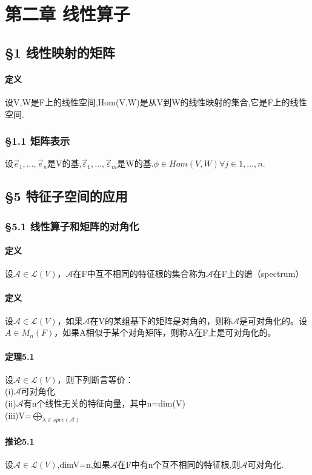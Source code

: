 \documentclass{ctexart}
\begin{document}
\section{第二章 线性算子}
\subsection{§1 线性映射的矩阵}
\paragraph{定义}
设V,W是F上的线性空间,Hom(V,W)是从V到W的线性映射的集合,它是F上的线性空间.
\subsubsection{§1.1 矩阵表示}
设$\vec{e}_{1},...,\vec{e}_{n}$是V的基,$\vec{\varepsilon}_{1},...,\vec{\varepsilon}_{m}$是W的基.$\phi  \in Hom(V,W)    \forall j \in 1,...,n$. 
\subsection{§5 特征子空间的应用}
\subsubsection{§5.1 线性算子和矩阵的对角化}
\paragraph{定义}
设$\mathcal{A}\in\mathcal{L}(V)$，$\mathcal{A}$在F中互不相同的特征根的集合称为$\mathcal{A}$在F上的谱（spectrum）
\paragraph{定义}
设$\mathcal{A}\in\mathcal{L}(V)$，如果$\mathcal{A}$在V的某组基下的矩阵是对角的，则称$\mathcal{A}$是可对角化的。设$A \in M_{n}(F)$，如果A相似于某个对角矩阵，则称A在F上是可对角化的。
\paragraph{定理5.1}
设$\mathcal{A}\in \mathcal{L}(V)$，则下列断言等价：\\
(i)$\mathcal{A}$可对角化\\
(ii)$\mathcal{A}$有n个线性无关的特征向量，其中n=dim(V)\\
(iii)V=$\bigoplus_{\lambda \in spec(\mathcal{A})}$\\
\paragraph{推论5.1}
设$\mathcal{A}\in\mathcal{L}(V)$,dimV=n,如果$\mathcal{A}$在F中有n个互不相同的特征根,则$\mathcal{A}$可对角化.
\end{document}
